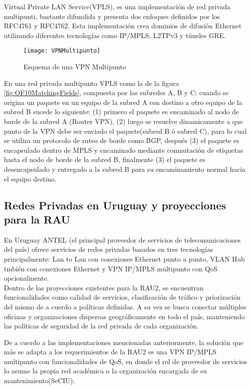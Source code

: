 Virtual Private LAN Service(VPLS), es una implementaci\'on de red privada multipunti, bastante difundida y presenta dos enfoques definidos por los  RFC4761\citep{kompella2007virtual} y RFC4762\cite{lasserre2007virtual}. Esta implementaci\'on crea dominios de difusión Ethernet utilizando diferentes tecnologías como IP/MPLS, L2TPv3 y túneles GRE.

\begin{figure}[htbp!] 
\centering    
\texttt{[image: VPNMultipunto]}
\caption[Esquema de una VPN Multipunto]{Esquema de una VPN Multipunto}
\label{fig:VPNMulipunto}
\end{figure}
 
En una red privada multipunto VPLS como la de la figura \ref{fig:OF10MatchingFields}, compuesta por las subredes A, B y C; cuando se origina un paquete en un equipo de la subred A con destino a otro equipo de la subred B sucede lo siguiente: (1) primero el paquete es encaminado al nodo de borde de la subred A (Router VPN), (2) luego se resuelve dinamicamente a que punto de la VPN debe ser enviado el paquete(subred B \'o subred C), para lo cual se utiliza un protocolo de ruteo de borde como BGP, despu\'es (3) el paquete es encapsulado dentro de MPLS y encaminado mediante conmutaci\'on de etiquetas hasta el nodo de borde de la subred B, finalmente (3) el paquete es desencapsulado y entregado a la subred B para su encaminamiento normal hacia el equipo destino.

\subsection{Redes Privadas en Uruguay y proyecciones para la RAU}
En Uruguay ANTEL (el principal proveedor de servicios de telecomunicaciones del país) ofrece servicios de redes privadas basados en tres tecnolog\'ias principalmente: Lan to Lan con conexiones Ethernet punto a punto, VLAN Hub tmbi\'en con conexiones Ethernet y VPN IP/MPLS multipunto con QoS opcionalmente.\\

Dentro de las proyecciones existentes para la RAU2, se encuentran funcionalidades como calidad de servicios, clasificaci\'on de tr\'afico y priorizaci\'on del mismo de a cuerdo a pol\'iticas definidas. A su vez se busca conectar m\'ultiples oficinas y organizaciones dispersas geogr\'aficamente en todo el país, manteniendo las pol\'iticas de seguridad de la red privada de cada organizaci\'on. 

De a cuerdo a las implementaciones mencionadas anteriormente, la soluci\'on que m\'as se adapta a los requerimientos de la RAU2 es una VPN IP/MPLS multipunto con funcionalidades de QoS, en donde el rol de proveedor de servicios lo asume la propia red académica o la organizaci\'on encargada de su mantenimiento(SeCIU).\\ 

